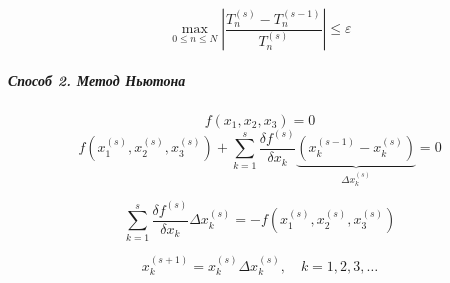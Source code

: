 \[
\max\limits_{0 \leq n \leq N} \left| \frac{T^{(s)}_n - T^{(s-1)}_n}{T^{(s)}_n} \right| \leq \varepsilon
\]

\subparagraph{Способ 2. Метод Ньютона}

\[
	f(x_1, x_2, x_3) = 0
\]
\[
	f\left(x^{(s)}_1, x^{(s)}_2, x^{(s)}_3\right) + \sum_{k = 1}^{s} \frac{\delta f^{(s)}}{\delta x_k} \underbrace{\left(x^{(s - 1)}_{k} - x^{(s)}_{k}\right)}_{\Delta x^{(s)}_k} = 0
\]

\[
\sum_{k = 1}^{s} \frac{\delta f^{(s)}}{\delta x_k} \Delta x^{(s)}_k = - f\left(x^{(s)}_1, x^{(s)}_2, x^{(s)}_3\right)
\]

\[
x^{(s+1)}_k = x^{(s)}_k \Delta x^{(s)}_k, \quad k = 1, 2, 3, \dots
\]

\[\]